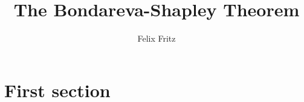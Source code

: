 \documentclass[10pt,a4paper,titlepage]{article}
\author{Felix Fritz}
\title{The Bondareva-Shapley Theorem}
\begin{document}
\maketitle

\tableofcontents
\pagebreak

\section{First section}
 

 
\medskip
 


\end{document}
